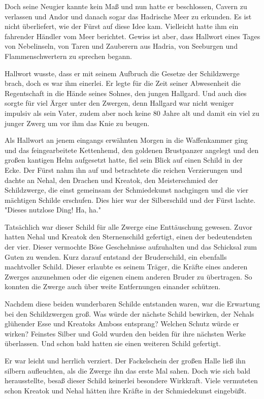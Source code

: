 \documentclass[10pt, a4paper, oneside]{book}
\begin{document}
\begin{multicols}{2}
Doch seine Neugier kannte kein Maß und nun hatte er beschlossen, Cavern zu verlassen und Andor und danach sogar das Hadrische Meer zu erkunden. Es ist nicht überliefert, wie der Fürst auf diese Idee kam. Vielleicht hatte ihm ein fahrender Händler vom Meer berichtet. Gewiss ist aber, dass Hallwort eines Tages von Nebelinseln, von Taren und Zauberern aus Hadria, von Seeburgen und Flammenschwertern zu sprechen begann.\bigskip

Hallwort wusste, dass er mit seinem Aufbruch die Gesetze der Schildzwerge brach, doch es war ihm einerlei. Er legte für die Zeit seiner Abwesenheit die Regentschaft in die Hände seines Sohnes, den jungen Hallgard. Und auch dies sorgte für viel Ärger unter den Zwergen, denn Hallgard war nicht weniger impulsiv als sein Vater, zudem aber noch keine 80 Jahre alt und damit ein viel zu junger Zwerg um vor ihm das Knie zu beugen.\bigskip

Als Hallwort an jenem eingangs erwähnten Morgen in die Waffenkammer ging und das feingearbeitete Kettenhemd, den goldenen Brustpanzer angelegt und den großen kantigen Helm aufgesetzt hatte, fiel sein Blick auf einen Schild in der Ecke. Der Fürst nahm ihn auf und betrachtete die reichen Verzierungen und dachte an Nehal, den Drachen und Kreatok, den Meisterschmied der Schildzwerge, die einst gemeinsam der Schmiedekunst nachgingen und die vier mächtigen Schilde erschufen. Dies hier war der Silberschild und der Fürst lachte. "Dieses nutzlose Ding! Ha, ha."\bigskip

Tatsächlich war dieser Schild für alle Zwerge eine Enttäuschung gewesen. Zuvor hatten Nehal und Kreatok den Sternenschild gefertigt, einen der  bedeutendsten der vier. Dieser vermochte Böse Geschehnisse aufzuhalten  und das Schicksal zum Guten zu wenden. Kurz darauf entstand der Bruderschild, ein ebenfalls machtvoller Schild.  Dieser erlaubte es seinem Träger, die Kräfte eines anderen Zwerges anzunehmen oder die eigenen einem anderen Bruder zu übertragen. So konnten die Zwerge auch über weite Entfernungen einander schützen.\bigskip

Nachdem diese beiden wunderbaren Schilde entstanden waren, war die Erwartung bei den Schildzwergen groß. Was würde der nächste Schild bewirken, der Nehals glühender Esse und Kreatoks Amboss entsprang? Welchen Schutz würde er wirken? Feinstes Silber und Gold wurden den beiden für ihre nächsten Werke überlassen. Und schon bald hatten sie einen weiteren Schild gefertigt.

Er war leicht und herrlich verziert. Der Fackelschein der großen Halle ließ ihn silbern aufleuchten, als die Zwerge ihn das erste Mal sahen. Doch wie sich bald herausstellte, besaß dieser Schild keinerlei besondere Wirkkraft. Viele vermuteten schon Kreatok und Nehal hätten ihre Kräfte in der Schmiedekunst eingebüßt.\bigskip


\end{multicols}
\end{document}
